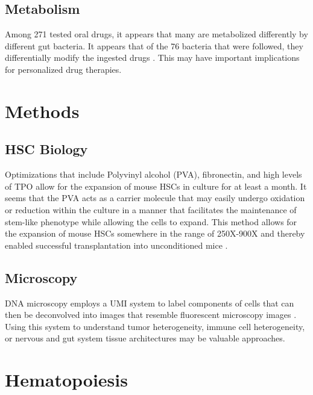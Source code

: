 \documentclass[]{book}
\begin{document}
\hypertarget{metabolism}{%
\section{Metabolism}\label{metabolism}}

Among 271 tested oral drugs, it appears that many are metabolized differently by different gut bacteria. It appears that of the 76 bacteria that were followed, they differentially modify the ingested drugs \citep{zimmermann2019mapping}. This may have important implications for personalized drug therapies.

\hypertarget{methods}{%
\chapter{Methods}\label{methods}}

\hypertarget{hsc-biology}{%
\section{HSC Biology}\label{hsc-biology}}

Optimizations that include Polyvinyl alcohol (PVA), fibronectin, and high levels of TPO allow for the expansion of mouse HSCs in culture for at least a month. It seems that the PVA acts as a carrier molecule that may easily undergo oxidation or reduction within the culture in a manner that facilitates the maintenance of stem-like phenotype while allowing the cells to expand. This method allows for the expansion of mouse HSCs somewhere in the range of 250X-900X and thereby enabled successful transplantation into unconditioned mice \citep{wilkinson2019long}.

\hypertarget{microscopy}{%
\section{Microscopy}\label{microscopy}}

DNA microscopy employs a UMI system to label components of cells that can then be deconvolved into images that resemble fluorescent microscopy images \citep{weinstein2019dna}. Using this system to understand tumor heterogeneity, immune cell heterogeneity, or nervous and gut system tissue architectures may be valuable approaches.

\hypertarget{hematopoiesis}{%
\chapter{Hematopoiesis}\label{hematopoiesis}}
\end{document}
